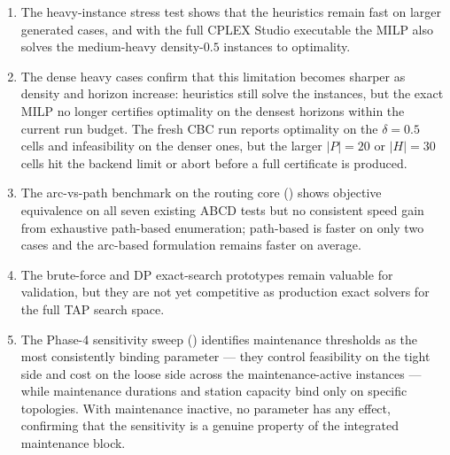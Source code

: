 \begin{enumerate}
  \item The heavy-instance stress test shows that the heuristics remain fast
    on larger generated cases, and with the full CPLEX Studio executable the
    MILP also solves the medium-heavy density-$0.5$ instances to optimality.
  \item The dense heavy cases confirm that this limitation becomes sharper as
    density and horizon increase: heuristics still solve the instances, but
    the exact MILP no longer certifies optimality on the densest horizons
    within the current run budget.  The fresh CBC run reports optimality on the
    $\delta=0.5$ cells and infeasibility on the denser ones, but the larger
    $|P|=20$ or $|H|=30$ cells hit the backend limit or abort before a full
    certificate is produced.
  \item The arc-vs-path benchmark on the routing core
    () shows objective equivalence on all
    seven existing ABCD tests but no consistent speed gain from exhaustive
    path-based enumeration; path-based is faster on only two cases and the
    arc-based formulation remains faster on average.
  \item The brute-force and DP exact-search prototypes remain valuable for
    validation, but they are not yet competitive as production exact solvers
    for the full TAP search space.
  \item The Phase-4 sensitivity sweep ()
    identifies maintenance thresholds as the most consistently binding
    parameter --- they control feasibility on the tight side and cost on the
    loose side across the maintenance-active instances --- while maintenance
    durations and station capacity bind only on specific topologies.  With
    maintenance inactive, no parameter has any effect, confirming that the
    sensitivity is a genuine property of the integrated maintenance block.
\end{enumerate}
